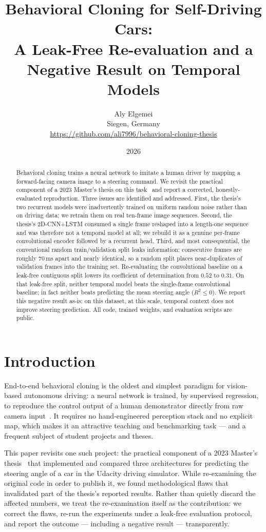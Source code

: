 \documentclass[11pt]{article}
\title{\textbf{Behavioral Cloning for Self-Driving Cars:\\
A Leak-Free Re-evaluation and a Negative Result on Temporal Models}}
\author{Aly Elgemei\\
  Siegen, Germany\\
  \url{https://github.com/ali7996/behavioral-cloning-thesis}}
\date{2026}
\begin{document}
\maketitle

\begin{abstract}
Behavioral cloning trains a neural network to imitate a human driver by mapping a
forward-facing camera image to a steering command. We revisit the practical
component of a 2023 Master's thesis on this task~\mbox{\citep{elgemei2023behavioral}} and
report a corrected, honestly-evaluated reproduction. Three issues are identified and
addressed. First, the thesis's two recurrent models were inadvertently trained on
uniform random noise rather than on driving data; we retrain them on real ten-frame
image sequences. Second, the thesis's 2D-CNN+LSTM consumed a single frame reshaped
into a length-one sequence and was therefore not a temporal model at all; we rebuild
it as a genuine per-frame convolutional encoder followed by a recurrent head. Third,
and most consequential, the conventional random train/validation split leaks
information: consecutive frames are roughly 70\,ms apart and nearly identical, so a
random split places near-duplicates of validation frames into the training set.
Re-evaluating the convolutional baseline on a leak-free contiguous split lowers its
coefficient of determination from $0.52$ to $0.31$. On that leak-free split, neither
temporal model beats the single-frame convolutional baseline; in fact neither beats
predicting the mean steering angle ($R^2 \le 0$). We report this negative result
as-is: on this dataset, at this scale, temporal context does not improve steering
prediction. All code, trained weights, and evaluation scripts are public.
\end{abstract}

\section{Introduction}

End-to-end behavioral cloning is the oldest and simplest paradigm for vision-based
autonomous driving: a neural network is trained, by supervised regression, to
reproduce the control output of a human demonstrator directly from raw camera
input~\mbox{\citep{pomerleau1989alvinn,bojarski2016end}}. It requires no hand-engineered
perception stack and no explicit map, which makes it an attractive teaching and
benchmarking task --- and a frequent subject of student projects and theses.

This paper revisits one such project: the practical component of a 2023 Master's
thesis~\mbox{\citep{elgemei2023behavioral}} that implemented and compared three
architectures for predicting the steering angle of a car in the Udacity driving
simulator. While re-examining the original code in order to publish it, we found
methodological flaws that invalidated part of the thesis's reported results. Rather
than quietly discard the affected numbers, we treat the re-examination itself as the
contribution: we correct the flaws, re-run the experiments under a leak-free
evaluation protocol, and report the outcome --- including a negative result ---
transparently.
\end{document}
